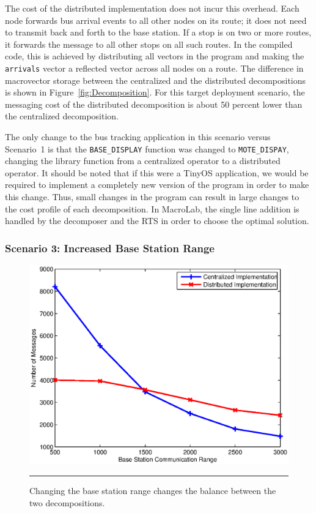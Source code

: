 The cost of the distributed implementation does not incur this overhead. Each
node forwards bus arrival events to all other nodes on its route; it does not
need to transmit back and forth to the base station.  If a stop is
on two or more routes, it forwards the message to all other stops on all such
routes.  In the compiled code, this is achieved by distributing all vectors in
the program and making the {\tt arrivals} vector a reflected vector across all
nodes on a route. The difference in macrovector storage between the centralized
and the distributed decompositions is shown in Figure~\ref{fig:Decomposition}.
For this target deployment scenario, the messaging cost of the distributed
decomposition is about 50 percent lower than the centralized decomposition.

The only change to the bus tracking application in this scenario versus
Scenario~1 is that the {\tt BASE\_DISPLAY} function was changed to {\tt MOTE\_DISPAY},
changing the library function from a centralized operator to a distributed
operator.  It should be noted that if this were a TinyOS application, we would
be required to implement a completely new version of the program in order to
make this change.  Thus, small changes in the program can result in large
changes to the cost profile of each decomposition.  In MacroLab, the single line
addition is handled by the decomposer and the RTS in order to choose the optimal
solution.

\subsubsection{Scenario 3: Increased Base Station Range}

\begin{figure}
  \centering
  \includegraphics[width=1\columnwidth]{fig/RangeCompare}
  \smallskip
  \hrule
  \caption{Changing the base station range changes the balance
  between the two decompositions.}
  \label{fig:RangeCompare}
\end{figure}

